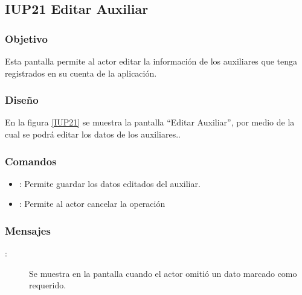 \subsection{IUP21 Editar Auxiliar}
 
\subsubsection{Objetivo}

    Esta pantalla permite al actor editar la información de los auxiliares que tenga registrados en su cuenta de la aplicación.

\subsubsection{Diseño}

    En la figura \ref{IUP21} se muestra la pantalla ``Editar Auxiliar'', por medio de la cual se podrá editar los datos de los auxiliares.. \\


\subsubsection{Comandos}
\begin{itemize}
    \item {}: Permite guardar los datos editados del auxiliar.
    \item {}: Permite al actor cancelar la operación
    
\end{itemize}

\subsubsection{Mensajes}

\begin{description}
    \item[:] Se muestra en la pantalla  cuando el actor omitió un dato marcado como requerido.
    
\end{description}
